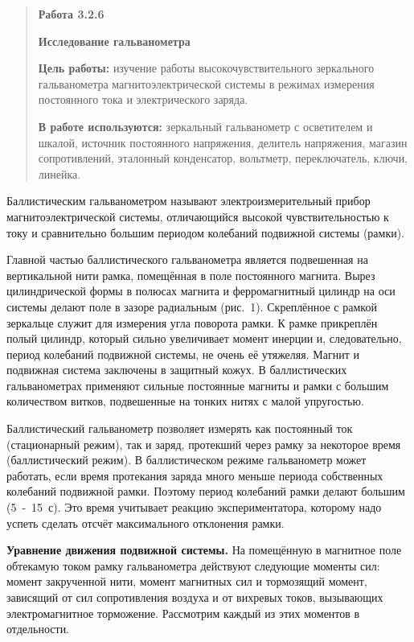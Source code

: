 \documentclass[]{article}
\date{}
\begin{document}
\begin{quote}
\textbf{Работа 3.2.6}

\textbf{Исследование гальванометра}

\textbf{Цель работы:} изучение работы высокочувствительного зеркального
гальванометра магнитоэлектрической системы в режимах измерения
постоянного тока и электрического заряда.

\textbf{В работе используются:} зеркальный гальванометр с осветителем и
шкалой, источник постоянного напряжения, делитель напряжения, магазин
сопротивлений, эталонный конденсатор, вольтметр, переключатель, ключи,
линейка.
\end{quote}

Баллистическим гальванометром называют электроизмерительный прибор
магнитоэлектрической системы, отличающийся высокой чувствительностью к
току и сравнительно большим периодом колебаний подвижной системы
(рамки).

Главной частью баллистического гальванометра является подвешенная на
вертикальной нити рамка, помещённая в поле постоянного магнита. Вырез
цилиндрической формы в полюсах магнита и ферромагнитный цилиндр на оси
системы делают поле в зазоре радиальным (рис.~1). Скреплённое с рамкой
зеркальце служит для измерения угла поворота рамки. К рамке прикреплён
полый цилиндр, который сильно увеличивает момент инерции и,
следовательно, период колебаний подвижной системы, не очень её утяжеляя.
Магнит и подвижная система заключены в защитный кожух. В баллистических
гальванометрах применяют сильные постоянные магниты и рамки с большим
количеством витков, подвешенные на тонких нитях с малой упругостью.

Баллистический гальванометр позволяет измерять как постоянный ток
(стационарный режим), так и заряд, протекший через рамку за некоторое
время (баллистический режим). В баллистическом режиме гальванометр может
работать, если время протекания заряда много меньше периода собственных
колебаний подвижной рамки. Поэтому период колебаний рамки делают большим
(5~-~15~с). Это время учитывает реакцию экспериментатора, которому надо
успеть сделать отсчёт максимального отклонения рамки.

\textbf{Уравнение движения подвижной системы.} На помещённую в магнитное
поле обтекамую током рамку гальванометра действуют следующие моменты
сил: момент закрученной нити, момент магнитных сил и тормозящий момент,
зависящий от сил сопротивления воздуха и от вихревых токов, вызывающих
электромагнитное торможение. Рассмотрим каждый из этих моментов в
отдельности.
\end{document}
